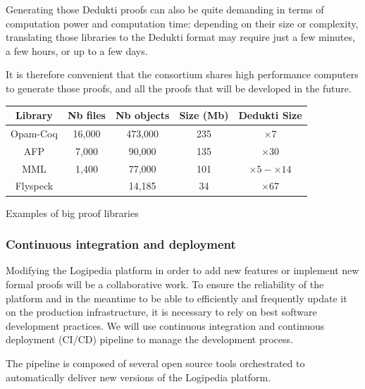 Generating those Dedukti proofs can also be quite demanding in terms
of computation power and computation time: depending on their size or
complexity, translating those libraries to the Dedukti format may
require just a few minutes, a few hours, or up to a few days.

It is therefore convenient that the consortium shares high performance
computers to generate those proofs, and all the proofs that will
be developed in the future.

\begin{center}
\begin{tabular}{|c|c|c|c|c|}\hline
\rowcolor{cyan}Library & Nb files & Nb objects & Size (Mb) & Dedukti Size\\\hline
Opam-Coq & 16,000 & 473,000 & 235 & $\times 7$\\\hline
AFP & 7,000 & 90,000 & 135 & $\times 30$\\\hline
MML & 1,400 & 77,000 & 101 & $\times 5-\times 14$\\\hline
Flyspeck & & 14,185 & 34 & $\times 67$\\\hline
\end{tabular}

\medskip

Examples of big proof libraries
\end{center}

\subsubsection*{Continuous integration and deployment}
Modifying the Logipedia platform in order to add new features or implement
new formal proofs will be a collaborative work. To ensure the reliability
of the platform and in the meantime to be able to efficiently and
frequently update it on the production infrastructure,
it is necessary to rely on best software development practices.
We will use continuous integration and continuous deployment (CI/CD)
pipeline to manage the development process.

The pipeline is composed of several open source tools orchestrated
to automatically deliver new versions of the Logipedia platform.

